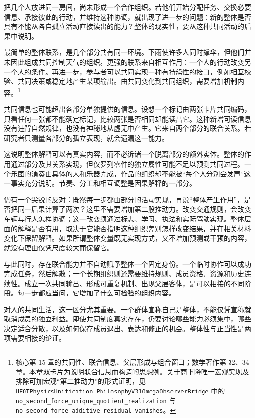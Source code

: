\documentclass[
  11pt,
  oneside]{book}
\begin{document}
把几个人放进同一房间，尚未形成一个合作组织。若他们开始分配任务、交换必要信息、承接彼此的行动，并维持这种协调，就出现了进一步的问题：新的整体是否具有不能从各自孤立活动直接读出的能力？整体的现实性，要从这种共同活动的后果中说明。

最简单的整体联系，是几个部分共有同一环境。下雨使许多人同时撑伞，但他们并未因此组成共同控制天气的组织。更强的联系来自相互作用：一个人的行动改变另一个人的条件。再进一步，参与者可以共同实现一种有持续性的接口，例如相互校验、共同决策或稳定地产生某项输出。由共同变化到共同组织，需要增加机制内容。\footnote{\hypertarget{ph-note-41}{}核心第 15 章的共同性、联合信息、父层形成与组合窗口；数学著作第 32、34 章。本章双卡片为说明联合信息而构造的思想例。关于商下降唯一宏观实现及排除可加宏观``第二推动力''的形式证明，见 \nolinkurl{UEOTPhysicsUnification.PhilosophyV31OmegaObserverBridge} 中的 \nolinkurl{no_second_force_unique_quotient_realization} 与 \nolinkurl{no_second_force_additive_residual_vanishes}。}

共同信息也可能超出各部分单独提供的信息。设想一个标记由两张卡片共同编码，只看任何一张都不能确定标记，比较两张是否相同却能读出它。这种新增可读信息没有违背自然规律，也没有神秘地从虚无中产生。它来自两个部分的联合关系。若研究者只测量各部分的孤立表现，就会遗漏这一能力。

这说明整体解释可以有真实内容，而不必诉诸一个脱离部分的额外实体。整体的作用通过部分及其关系实现，但仅罗列零件的独立属性可能不足以预测共同过程。一个乐团的演奏由具体的人和乐器完成，作品的组织却不能被``每个人分别会发声''这一事实充分说明。节奏、分工和相互调整是因果解释的一部分。

仍有一个尖锐的反对：既然每一步都由部分的活动实现，再说``整体产生作用''，是否把同一后果计算了两次？这里不需要增加第二股推动力。改变交通规则，会改变车辆与行人怎样协调；这一改变须通过标志、学习、执法和实际驾驶实现。整体层面的解释是否有用，取决于它能否指明这种组织差别怎样改变结果，并在相关材料变化下保留解释。如果所谓整体变量既无实现方式，又不增加预测或干预的内容，就没有理由仅凭尺度较大而保留它。

与此同时，存在联合能力并不自动赋予整体一个固定身份。一个临时协作可以成功完成任务，然后解散；一个长期组织则还需要维持规则、成员资格、资源和历史连续性。成立一次共同输出、形成可重复机制、出现父层客体，是可以相接的不同阶段。每一步都应当问，它增加了什么可检验的组织内容。

对人的共同生活，这一区分尤其重要。一个群体宣称自己是整体，不能仅凭宣称就取消成员的独立利益。即使共同制度真实存在，仍要讨论哪些能力必须集中，哪些决定适合分散，以及如何保存成员退出、表达和修正的机会。整体性与正当性是两项需要相接的论证。
\end{document}
